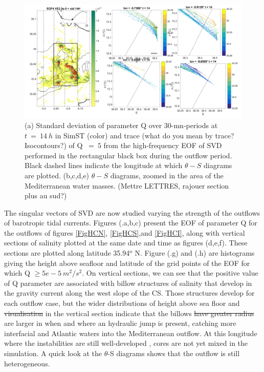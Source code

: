 \begin{figure}[!h]
 \includegraphics[width=\textwidth]{./GBR3D/TS_coupes_14H_VE2o.png}
 \caption {(a) Standard deviation of parameter Q over 30-mn-periods at $t\ =\ 14\ h$ in SimST (color) and trace \color{green}(what do you mean by trace? Isocontours?) of Q $\ =\ 5$\color{black}  from the high-frequency EOF of SVD performed in the rectangular black box during the outflow period. Black dashed lines indicate the longitude at which $\theta-S$ diagrams are plotted. (b,c,d,e) $\theta-S$ diagrams, zoomed in the area of the Mediterranean water masses.  \color{green}(Mettre LETTRES, rajouer section plus au sud?) \color{black}}
 \label{FigTSCS}
\end{figure}

\color{blue}The singular vectors of SVD are now studied varying the strength of the outflows of barotropic tidal currents. \color{black} Figures (.a,b,c) present the EOF of parameter Q for the outflows of figures \ref{FigHCN}, \ref{FigHCS},and \ref{FigHCI}, along with vertical sections of salinity plotted \color{blue}at the same date and time \color{black} as figures (d,e,f). These sections are plotted along latitude 35.94$^\text{o}$ N. Figure (.g) and (.h) are histograms giving the height above seafloor and latitude of the grid points of the EOF for which Q $\geq 5e-5\ m^2/s^2$. On vertical sections, we can see that the positive value of Q parameter are associated with billow structures of salinity that develop in the gravity current along the west slope of the CS. Those structures develop for each outflow case, but the wider distributions of height above sea floor and \sout{visualisation} in the vertical section  \color{blue}indicate that \color{black} the billows \color{blue}\sout{have greater radius} are larger in \color{black} when and where an hydraulic jump is present, catching more interfacial and Atlantic waters into the Mediterranean outflow. At this longitude where the instabilities are still \color{blue}well-developed \color{black}, cores are not yet mixed in the simulation. A quick look at the $\theta$-S diagrams shows \color{blue} that the outflow is still heterogeneous.

